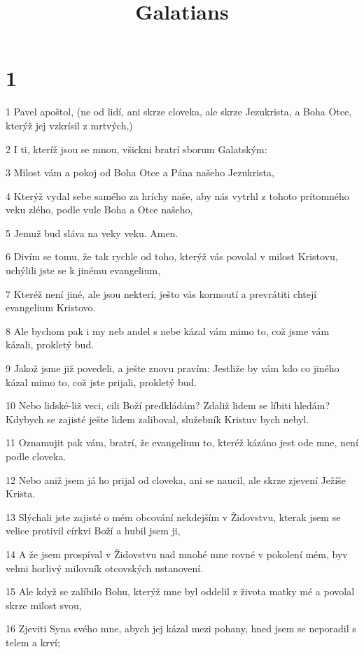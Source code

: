 

\title{Galatians}

\chapter{1}

\par 1 Pavel apoštol, (ne od lidí, ani skrze cloveka, ale skrze Jezukrista, a Boha Otce, kterýž jej vzkrísil z mrtvých,)
\par 2 I ti, kteríž jsou se mnou, všickni bratrí sborum Galatským:
\par 3 Milost vám a pokoj od Boha Otce a Pána našeho Jezukrista,
\par 4 Kterýž vydal sebe samého za hríchy naše, aby nás vytrhl z tohoto prítomného veku zlého, podle vule Boha a Otce našeho,
\par 5 Jemuž bud sláva na veky veku. Amen.
\par 6 Divím se tomu, že tak rychle od toho, kterýž vás povolal v milost Kristovu, uchýlili jste se k jinému evangelium,
\par 7 Kteréž není jiné, ale jsou nekterí, ješto vás kormoutí a prevrátiti chtejí evangelium Kristovo.
\par 8 Ale bychom pak i my neb andel s nebe kázal vám mimo to, což jsme vám kázali, prokletý bud.
\par 9 Jakož jsme již povedeli, a ješte znovu pravím: Jestliže by vám kdo co jiného kázal mimo to, což jste prijali, prokletý bud.
\par 10 Nebo lidské-liž veci, cili Boží predkládám? Zdaliž lidem se líbiti hledám? Kdybych se zajisté ješte lidem zaliboval, služebník Kristuv bych nebyl.
\par 11 Oznamujit pak vám, bratrí, že evangelium to, kteréž kázáno jest ode mne, není podle cloveka.
\par 12 Nebo aniž jsem já ho prijal od cloveka, ani se naucil, ale skrze zjevení Ježíše Krista.
\par 13 Slýchali jste zajisté o mém obcování nekdejším v Židovstvu, kterak jsem se velice protivil církvi Boží a hubil jsem ji,
\par 14 A že jsem prospíval v Židovstvu nad mnohé mne rovné v pokolení mém, byv velmi horlivý milovník otcovských ustanovení.
\par 15 Ale když se zalíbilo Bohu, kterýž mne byl oddelil z života matky mé a povolal skrze milost svou,
\par 16 Zjeviti Syna svého mne, abych jej kázal mezi pohany, hned jsem se neporadil s telem a krví;
